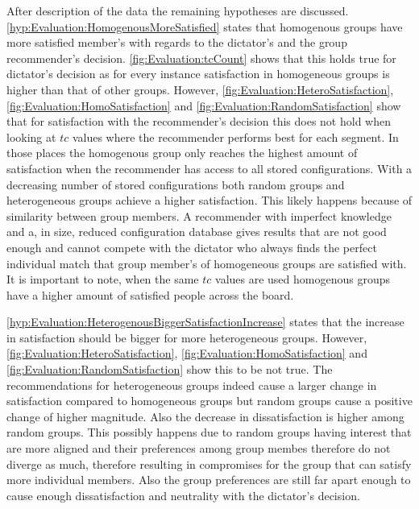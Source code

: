 After description of the data the remaining hypotheses are discussed.
\autoref{hyp:Evaluation:HomogenousMoreSatisfied} states that homogenous groups have more satisfied member's with regards to the dictator's and the group recommender's decision. \autoref{fig:Evaluation:tcCount} shows that this holds true for dictator's decision as for every instance satisfaction in homogeneous groups is higher than that of other groups. However, \autoref{fig:Evaluation:HeteroSatisfaction}, \autoref{fig:Evaluation:HomoSatisfaction} and \autoref{fig:Evaluation:RandomSatisfaction} show that for satisfaction with the recommender's decision this does not hold when looking at $tc$ values where the recommender performs best for each  segment. In those places the homogenous group only reaches the highest amount of satisfaction when the recommender has access to all stored configurations. With a decreasing number of stored configurations both random groups and heterogeneous groups achieve a higher satisfaction. This likely happens because of similarity between group members. A recommender with imperfect knowledge and a, in size, reduced configuration database gives results that are not good enough and cannot compete with the dictator who always finds the perfect individual match that group member's of homogeneous groups are satisfied with. It is important to note, when the same $tc$ values are used homogenous groups have a higher amount of satisfied people across the board.

\autoref{hyp:Evaluation:HeterogenousBiggerSatisfactionIncrease} states that the increase in satisfaction should be bigger for more heterogeneous groups. However, \autoref{fig:Evaluation:HeteroSatisfaction}, \autoref{fig:Evaluation:HomoSatisfaction} and \autoref{fig:Evaluation:RandomSatisfaction} show this to be not true. The recommendations for heterogeneous groups indeed cause a larger change in satisfaction compared to homogeneous groups but random groups cause a positive change of higher magnitude. Also the decrease in dissatisfaction is higher among random groups. This possibly happens due to random groups having interest that are more aligned and their preferences among group membes therefore do not diverge as much, therefore resulting in compromises for the group that can satisfy more individual members. Also the group preferences are still far apart enough to cause enough dissatisfaction and neutrality with the dictator's decision.

